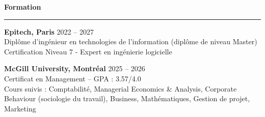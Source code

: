 \documentclass[9pt]{extarticle}
\begin{document}
\par\vspace{8pt}


{\large\bfseries Formation}
\par\vspace{-8pt}
\rule{\linewidth}{0.4pt}
\par\vspace{5pt}

{\bfseries Epitech, Paris} \hfill 2022 -- 2027 \\
Diplôme d'ingénieur en technologies de l'information (diplôme de niveau Master) \\
Certification Niveau 7 - Expert en ingénierie logicielle

\vspace{6pt}

{\bfseries McGill University, Montréal} \hfill 2025 -- 2026 \\
Certificat en Management -- GPA : 3.57/4.0 \\
Cours suivis : Comptabilité, Managerial Economics \& Analysis, Corporate Behaviour (sociologie du travail), Business, Mathématiques, Gestion de projet, Marketing
\end{document}
